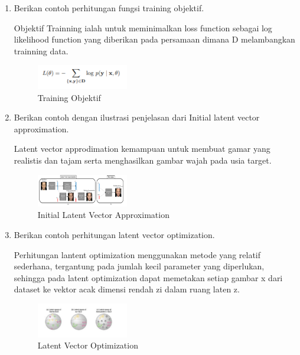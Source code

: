 \begin{enumerate}
        \item Berikan contoh perhitungan fungsi training objektif.

Objektif Trainning ialah untuk meminimalkan loss function sebagai log likelihood function yang diberikan pada persamaan dimana D melambangkan trainning data.

	\begin{figure}[H]
		\includegraphics[width=4cm]{figures/1174069/9/teori9.PNG}
            	\centering
           	 \caption{Training Objektif}
       	 \end{figure}

        \item Berikan contoh dengan ilustrasi penjelasan dari Initial latent vector approximation.

Latent vector approdimation kemampuan untuk membuat gamar yang realistis dan tajam serta menghasilkan gambar wajah pada usia target.

	\begin{figure}[H]
		\includegraphics[width=4cm]{figures/1174069/9/teori10.PNG}
            	\centering
           	 \caption{Initial Latent Vector Approximation}
       	 \end{figure}

        \item Berikan contoh perhitungan latent vector optimization.

Perhitungan lantent optimization menggunakan metode yang relatif sederhana, tergantung pada jumlah kecil parameter yang diperlukan, sehingga pada latent optimization dapat memetakan setiap gambar x dari dataset ke vektor acak dimensi rendah zi dalam ruang laten z.

	\begin{figure}[H]
		\includegraphics[width=4cm]{figures/1174069/9/teori11.PNG}
            	\centering
           	 \caption{Latent Vector Optimization}
       	 \end{figure}

\end{enumerate}

